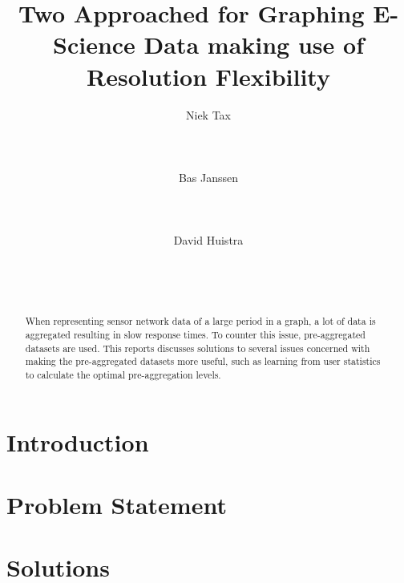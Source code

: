 \documentclass{sig-alternate-br}
\begin{document}

\title{Two Approached for Graphing E-Science Data making use of Resolution Flexibility}

\author{
\alignauthor Niek Tax\\
       \\
       \\
       \\
\alignauthor Bas Janssen\\
       \\
       \\
       \\
\alignauthor David Huistra\\
              \\
              \\
              \\
}

\maketitle
\begin{abstract}
When representing sensor network data of a large period in a graph, a lot of data is aggregated resulting in slow response times. To counter this issue, pre-aggregated
datasets are used. This reports discusses solutions to several issues concerned with making the pre-aggregated datasets more useful, such as learning from user statistics to calculate the optimal pre-aggregation levels.
\end{abstract} 


\section{Introduction}

\section{Problem Statement}

\section{Solutions}


%




\balancecolumns

\onecolumn
\end{document}
